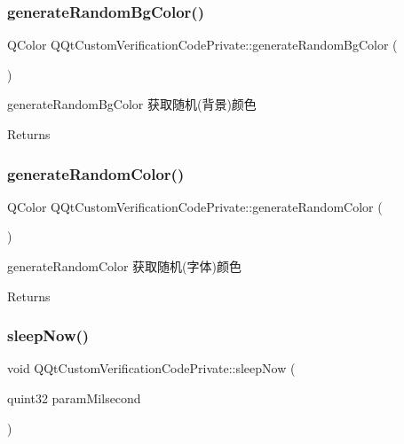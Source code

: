 \subsubsection{\texorpdfstring{generate\+Random\+Bg\+Color()}{generateRandomBgColor()}}
{\footnotesize\ttfamily Q\+Color Q\+Qt\+Custom\+Verification\+Code\+Private\+::generate\+Random\+Bg\+Color (\begin{DoxyParamCaption}{ }\end{DoxyParamCaption})}



generate\+Random\+Bg\+Color 获取随机(背景)颜色 

\begin{DoxyReturn}{Returns}

\end{DoxyReturn}
\mbox{\label{class_q_qt_custom_verification_code_private_a28a699e22baf587512d4274cef5c5a8d}} 
\subsubsection{\texorpdfstring{generate\+Random\+Color()}{generateRandomColor()}}
{\footnotesize\ttfamily Q\+Color Q\+Qt\+Custom\+Verification\+Code\+Private\+::generate\+Random\+Color (\begin{DoxyParamCaption}{ }\end{DoxyParamCaption})}



generate\+Random\+Color 获取随机(字体)颜色 

\begin{DoxyReturn}{Returns}

\end{DoxyReturn}
\mbox{\label{class_q_qt_custom_verification_code_private_a46d079ea663498dd608d356971ac2891}} 
\subsubsection{\texorpdfstring{sleep\+Now()}{sleepNow()}}
{\footnotesize\ttfamily void Q\+Qt\+Custom\+Verification\+Code\+Private\+::sleep\+Now (\begin{DoxyParamCaption}\item[{quint32}]{param\+Milsecond }\end{DoxyParamCaption})}



